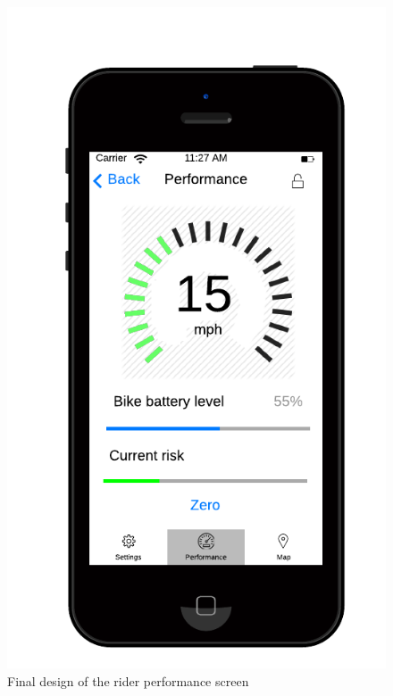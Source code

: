 \documentclass[a4paper]{report}
\begin{document}
{\begin{figure}[h]
\includegraphics[scale=0.6]{figures/final_design/performance}
\caption{Final design of the rider performance screen}
\end{figure}

}
\end{document}
